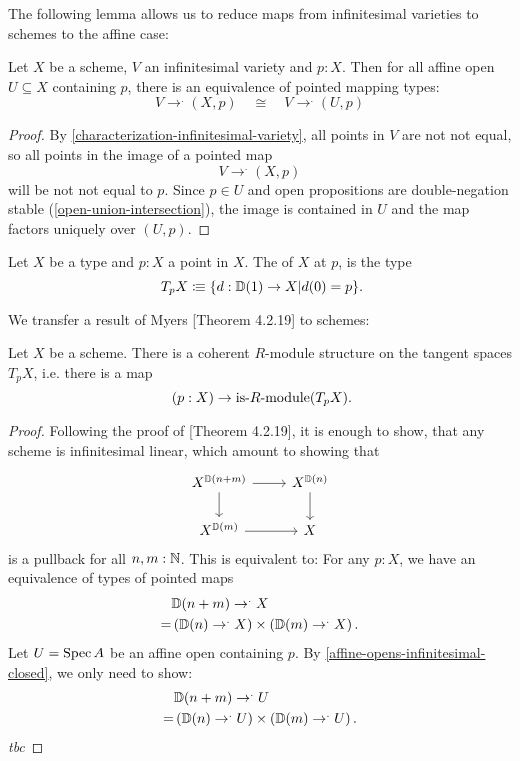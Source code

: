 The following lemma allows us to reduce
maps from infinitesimal varieties to schemes
to the affine case:

\begin{lemma}%
  \label{affine-opens-infinitesimal-closed}
  Let $X$ be a scheme, $V$ an infinitesimal variety and $p:X$.
  Then for all affine open $U\subseteq X$
  containing $p$, there is an equivalence
  of pointed mapping types:
  \[ V\to^. (X, p) \quad\cong\quad V\to^. (U, p) \]
\end{lemma}

\begin{proof}
  By \cref{characterization-infinitesimal-variety},
  all points in $V$ are not not equal,
  so all points in the image of a pointed map
  \[ V \to^. (X, p) \]
  will be not not equal to $p$.
  Since $p \in U$ and open propositions are double-negation stable
  (\cref{open-union-intersection}),
  the image is contained in $U$
  and the map factors uniquely over $(U, p)$.
\end{proof}

\begin{definition}
  Let $X$ be a type and $p:X$ a point in $X$.
  The  of $X$ at $p$, is the type
  \[ T_pX\colonequiv \{d:\D(1)\to X\vert d(0)=p \}\rlap{.}\]
\end{definition}

We transfer a result of Myers \cite{david-orbifolds}[Theorem 4.2.19] to schemes:

\begin{theorem}%
  Let $X$ be a scheme.
  There is a coherent $R$-module structure on the tangent spaces $T_pX$,
  i.e. there is a map
  \[ (p:X)\to \text{is-$R$-module}(T_pX)\rlap{.}\]
\end{theorem}

\begin{proof}
  Following the proof of \cite{david-orbifolds}[Theorem 4.2.19],
  it is enough to show, that any scheme is infinitesimal linear,
  which amount to showing that
  \[
    \begin{tikzcd}
      X^{\D(n+m)}\ar[r]\ar[d] & X^{\D(n)}\ar[d] \\
      X^{\D(m)}\ar[r]         & X
    \end{tikzcd}
  \]
  is a pullback for all $n,m:\mathbb{N}$.
  This is equivalent to:
  For any $p:X$, we have an equivalence of types of pointed maps
  \begin{align*}
    &\mathbb{D}(n+m)\to^.X \\
    = &\left(\mathbb{D}(n)\to^.X\right) \times \left({\mathbb{D}(m)}\to^.X\right).
  \end{align*}
  Let $U=\operatorname{Spec} A$ be an affine open containing $p$.
  By \cref{affine-opens-infinitesimal-closed},
  we only need to show:
  \begin{align*}
    &\mathbb{D}(n+m)\to^.U \\
    = &\left(\mathbb{D}(n)\to^.U\right) \times \left({\mathbb{D}(m)}\to^.U\right).
  \end{align*}
  \emph{tbc}
\end{proof}
